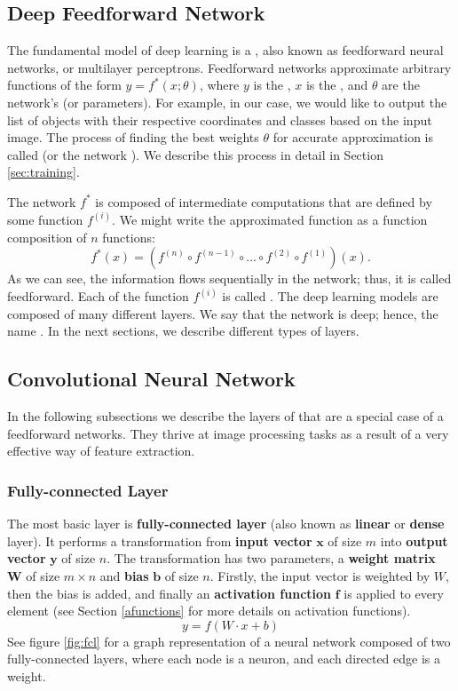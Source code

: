 \subsection{Deep Feedforward Network}
The fundamental model of deep learning is a , also
known as feedforward neural networks, or multilayer perceptrons. Feedforward
networks approximate arbitrary functions of the form $y = f^*(x;\theta)$, where
$y$ is the , $x$ is the , and $\theta$ are the network's
 (or parameters). For example, in our case, we would like to
output the list of objects with their respective coordinates and classes based
on the input image. The process of finding the best weights $\theta$ for
accurate approximation is called  (or the network ).
We describe this process in detail in Section \ref{sec:training}.

The network $f^*$ is composed of intermediate computations that are defined by
some function $f^{(i)}$. We might write the approximated function as a function
composition of $n$ functions:
$$
    f^*(x) = (f^{(n)} \circ f^{(n-1)} \circ ... \circ f^{(2)} \circ f^{(1)})(x).
$$
As we can see, the information flows sequentially in the network; thus, it is
called feedforward. Each of the function $f^{(i)}$ is called . The
deep learning models are composed of many different layers. We say that the
network is deep; hence, the name . In the next sections, we
describe different types of layers.



\subsection{Convolutional Neural Network}
In the following subsections we describe the layers of  that are a special case of a feedforward networks. They thrive at
image processing tasks as a result of a very effective way of feature
extraction.

\subsubsection{Fully-connected Layer}
The most basic layer is \textbf{fully-connected layer} (also known as
\textbf{linear} or \textbf{dense} layer). It performs a transformation from
\textbf{input vector} $\boldsymbol{x}$ of size $m$ into \textbf{output vector}
$\boldsymbol{y}$ of size $n$. The transformation has two parameters, a
\textbf{weight matrix} $\boldsymbol{W}$ of size $m \times n$ and \textbf{bias}
$\boldsymbol{b}$ of size $n$. Firstly, the input vector is weighted by $W$, then
the bias is added, and finally an \textbf{activation function} $\boldsymbol{f}$
is applied to every element (see Section \ref{afunctions} for more details on
activation functions).
$$
    y = f(W\cdot x + b)
$$
See figure \ref{fig:fcl} for a graph representation of a neural network composed
of two fully-connected layers, where each node is a neuron, and each directed
edge is a weight.

